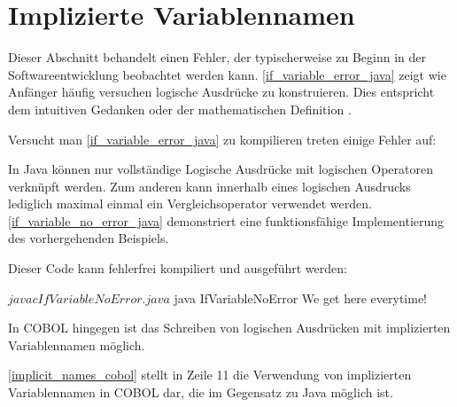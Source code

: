 \section{Implizierte Variablennamen}

Dieser Abschnitt behandelt einen Fehler, der typischerweise zu Beginn in der Softwareentwicklung beobachtet werden kann. \autoref{if_variable_error_java} zeigt wie Anfänger häufig versuchen logische Ausdrücke zu konstruieren. Dies entspricht dem intuitiven Gedanken  oder der mathematischen Definition .\\


Versucht man \autoref{if_variable_error_java} zu kompilieren treten einige Fehler auf:\\

\begin{shellwindow}
$ javac -Xmaxerrs 3 IfVariableError.java 
IfVariableError.java:4: error: > expected
        if (System.currentTimeMillis() > 0 && < Long.MAX_VALUE) {
                                                              ^
IfVariableError.java:4: error: ')' expected
        if (System.currentTimeMillis() > 0 && < Long.MAX_VALUE) {
                                                               ^
IfVariableError.java:8: error: illegal start of type
        if (0 < System.currentTimeMillis() < Long.MAX_VALUE) {
        ^
3 errors
\end{shellwindow}

In Java können nur vollständige Logische Ausdrücke mit logischen Operatoren verknüpft werden. Zum anderen kann innerhalb eines logischen Ausdrucks lediglich maximal einmal ein Vergleichsoperator verwendet werden. \autoref{if_variable_no_error_java} demonstriert eine funktionsfähige Implementierung des vorhergehenden Beispiels.\\


Dieser Code kann fehlerfrei kompiliert und ausgeführt werden:\\

\begin{shellwindow}
$ javac IfVariableNoError.java 
$ java IfVariableNoError
We get here everytime!
\end{shellwindow}

In COBOL hingegen ist das Schreiben von logischen Ausdrücken mit implizierten Variablennamen möglich.\\


\autoref{implicit_names_cobol} stellt in Zeile 11 die Verwendung von implizierten Variablennamen in COBOL dar, die im Gegensatz zu Java möglich ist.